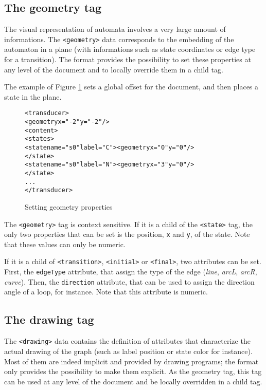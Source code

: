 \documentclass[a4paper]{llncs}
\begin{document}
\subsection{The geometry tag}

The visual representation of automata involves a very large amount of
informations.  The \verb|<geometry>| data corresponds to the embedding
of the automaton in a plane (with informations such as state
coordinates or edge type for a transition). The
format provides the possibility to set these properties at any level of the
document and to locally override them in a child tag.

The example of Figure \ref{geom1} sets a global offset
for the document, and then places a state in the plane.
{\small

\begin{figure}[h]
  \begin{center}
\begin{alltt}
<transducer>
  <geometry x="-2" y="-2"/> 
  <content>
     <states>
        <state name="s0" label="C"><geometry x="0" y="0"/>
        </state>
        <state name="s0" label="N"><geometry x="3" y="0"/>
        </state>
      ...
</transducer>
\end{alltt}

\caption{Setting geometry properties}
\label{geom1}
  \end{center}
\end{figure}

}

The \verb|<geometry>| tag is context sensitive. If it is a child of
the \verb|<state>| tag, the only two properties that can be set is the
position, \verb|x| and \verb|y|, of the state. Note that these values
can only be numeric.

If it is a child of \verb|<transition>|, \verb|<initial>| or
\verb|<final>|, two attributes can be set. First, the \verb|edgeType|
attribute, that assign the type of the edge (\textit{line},
\textit{arcL}, \textit{arcR}, \textit{curve}). Then, the
\verb|direction| attribute, that can be used to assign the direction
angle of a loop, for instance. Note that this attribute is numeric.


\subsection{The drawing tag}
The \verb|<drawing>| data
contains the definition of attributes that characterize the actual
drawing of the graph (such as label position or state color for
instance).
\\Most of them are indeed implicit and provided by drawing programs; the
format only provides the possibility to make them explicit.
As the geometry tag, this tag can be used at any level of the
document and be locally overridden in a child tag.
\end{document}
